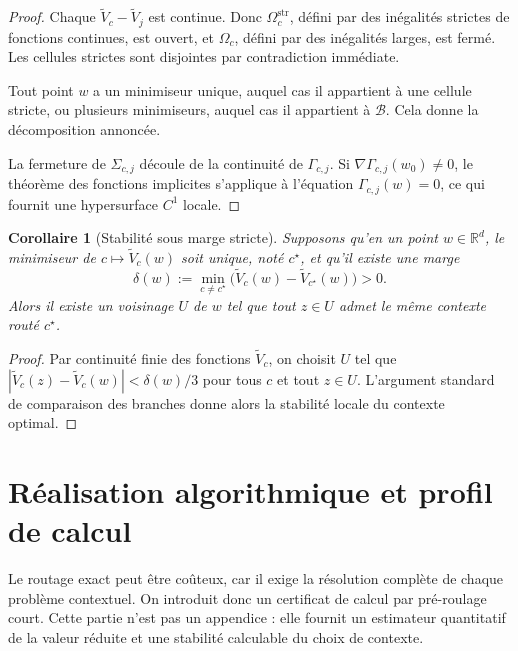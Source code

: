 \documentclass[11pt,a4paper]{article}
\newtheorem{corollary}{Corollaire}[section]
\newcommand{\R}{\mathbb R}
\newcommand{\Bcal}{\mathcal B}
\begin{document}
\begin{proof}
Chaque \(\widetilde V_c-\widetilde V_j\) est continue. Donc \(\Omega_c^{\mathrm{str}}\), défini par des inégalités strictes de fonctions continues, est ouvert, et \(\Omega_c\), défini par des inégalités larges, est fermé. Les cellules strictes sont disjointes par contradiction immédiate.

Tout point \(w\) a un minimiseur unique, auquel cas il appartient à une cellule stricte, ou plusieurs minimiseurs, auquel cas il appartient à \(\Bcal\). Cela donne la décomposition annoncée.

La fermeture de \(\Sigma_{c,j}\) découle de la continuité de \(\Gamma_{c,j}\). Si \(\nabla\Gamma_{c,j}(w_0)\neq 0\), le théorème des fonctions implicites s'applique à l'équation \(\Gamma_{c,j}(w)=0\), ce qui fournit une hypersurface \(C^1\) locale.
\end{proof}

\begin{corollary}[Stabilité sous marge stricte]
Supposons qu'en un point \(w\in\R^d\), le minimiseur de \(c\mapsto \widetilde V_c(w)\) soit unique, noté \(c^\star\), et qu'il existe une marge
\[
\delta(w):=\min_{c\neq c^\star}\bigl(\widetilde V_c(w)-\widetilde V_{c^\star}(w)\bigr)>0.
\]
Alors il existe un voisinage \(U\) de \(w\) tel que tout \(z\in U\) admet le même contexte routé \(c^\star\).
\end{corollary}

\begin{proof}
Par continuité finie des fonctions \(\widetilde V_c\), on choisit \(U\) tel que \(|\widetilde V_c(z)-\widetilde V_c(w)|<\delta(w)/3\) pour tous \(c\) et tout \(z\in U\). L'argument standard de comparaison des branches donne alors la stabilité locale du contexte optimal.
\end{proof}

\section{Réalisation algorithmique et profil de calcul}

Le routage exact peut être coûteux, car il exige la résolution complète de chaque problème contextuel. On introduit donc un certificat de calcul par pré-roulage court. Cette partie n'est pas un appendice : elle fournit un estimateur quantitatif de la valeur réduite et une stabilité calculable du choix de contexte.
\end{document}
